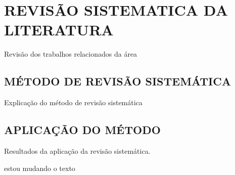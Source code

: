 
\chapter{REVISÃO SISTEMATICA DA LITERATURA}
\label{chap:revisaoSistematica}
Revisão dos trabalhos relacionados da área

\section{MÉTODO DE REVISÃO SISTEMÁTICA}
\label{sec:metodoRevisao}
Explicação do método de revisão sistemática

\section{APLICAÇÃO DO MÉTODO}
\label{sec:aplicacaoRevisao}
Resultados da aplicação da revisão sistemática.

estou mudando o texto




